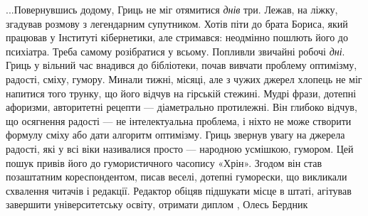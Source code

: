 ...Повернувшись додому, Гриць не міг отямитися \emph{днів} три. Лежав, на
ліжку, згадував розмову з легендарним супутником. Хотів піти до брата Бориса,
який працював у Інституті кібернетики, але стримався: неодмінно пошлють його до
психіатра. Треба самому розібратися у всьому.  Попливли звичайні робочі
\emph{дні}. Гриць у вільний час внадився до бібліотеки, почав вивчати проблему
оптимізму, радості, сміху, гумору. Минали тижні, місяці, але з чужих джерел
хлопець не міг напитися того трунку, що його відчув на гірській стежині. Мудрі
фрази, дотепні афоризми, авторитетні рецепти — діаметрально протилежні. Він
глибоко відчув, що осягнення радості — не інтелектуальна проблема, і ніхто не
може створити формулу сміху або дати алгоритм оптимізму.  Гриць звернув увагу
на джерела радості, які у всі віки називалися просто — народною усмішкою,
гумором. Цей пошук привів його до гумористичного часопису «Хрін». Згодом він
став позаштатним кореспондентом, писав веселі, дотепні гуморески, що викликали
схвалення читачів і редакції. Редактор обіцяв підшукати місце в штаті, агітував
завершити університетську освіту, отримати диплом
, Олесь Бердник
